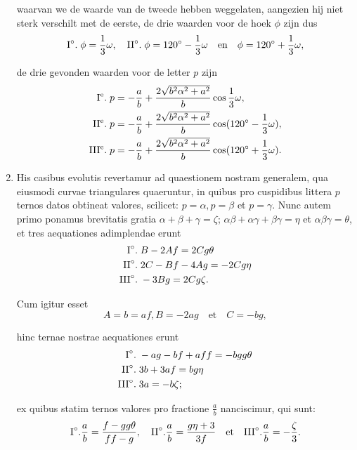 \documentclass[10pt,a4paper]{article}
\begin{document}
\begin{paracol}{2}
\begin{enumerate}[topsep=1px]
		\par waarvan we de waarde van de tweede hebben weggelaten, aangezien hij niet sterk verschilt met de eerste, de drie waarden voor de hoek $\phi$ zijn dus
		\[
			\text{I}\degree.\; \phi = \frac{1}{3}\omega, \quad \text{II}\degree.\; \phi = 120\degree - \frac{1}{3}\omega \quad \text{en}\quad  \phi = 120\degree +\frac{1}{3}\omega,
		\]
		\par de drie gevonden waarden voor de letter $p$ zijn
		\begin{align*}
			\text{I\textsuperscript{e}.}\;  p &= -\frac{a}{b}+\frac{2\sqrt{b^2\alpha^2 + a^2}}{b} \cos \frac{1}{3} \omega,\\
			\text{II\textsuperscript{e}.}\; p &= -\frac{a}{b}+\frac{2\sqrt{b^2\alpha^2 + a^2}}{b} \cos (120\degree - \frac{1}{3}\omega),\\
			\text{III\textsuperscript{e}.}\; p & = -\frac{a}{b}+\frac{2\sqrt{b^2\alpha^2+a^2}}{b} \cos (120\degree + \frac{1}{3}\omega).
		\end{align*}
		
		\switchcolumn*
		
		\item His casibus evolutis revertamur ad quaestionem nostram generalem, qua eiusmodi curvae triangulares quaeruntur, in quibus pro cuspidibus littera $p$ ternos datos obtineat valores, scilicet: $p=\alpha, p=\beta$ et $p=\gamma$. Nunc autem primo ponamus brevitatis gratia $\alpha+\beta+\gamma = \zeta$; $\alpha\beta + \alpha \gamma + \beta \gamma = \eta$ et $\alpha \beta \gamma = \theta$, et tres aequationes adimplendae erunt
		\begin{align*}
			\text{I}\degree. \;&B -2Af = 2Cg\theta\\
			\text{II}\degree. \;& 2C-Bf-4Ag = -2Cg\eta\\
			\text{III}\degree. \;& -3Bg = 2Cg\zeta.
		\end{align*}
		\par Cum igitur esset
		\[
			A=b=af, B=-2ag \quad \text{et}\quad C= -bg,
		\]
		\par hinc ternae nostrae aequationes erunt
		\begin{align*}
			\text{I}\degree. \;& -ag -bf + aff = -bgg\theta\\
			\text{II}\degree. \;& 3b + 3af = bg\eta\\
			\text{III}\degree. \;& 3a = -b\zeta;		
		\end{align*}
		\par ex quibus statim ternos valores pro fractione $\frac{a}{b}$ nanciscimur, qui sunt:
		\[
			\text{I}\degree. \frac{a}{b} = \frac{f-gg\theta}{ff-g},\quad  \text{II}\degree. \frac{a}{b} = \frac{g\eta + 3}{3f} \quad \text{et}\quad \text{III}\degree. \frac{a}{b} = -\frac{\zeta}{3}.
		\]
		

\end{enumerate}
\end{paracol}
\end{document}
